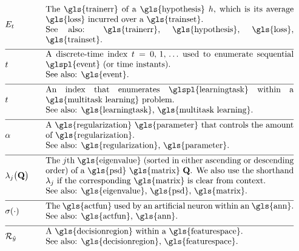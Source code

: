 \begin{align}                          
	&\trainerror &\quad &\parbox{.85\textwidth}{The \gls{trainerr} of a \gls{hypothesis} $\hypothesis$, which is its 
		average \gls{loss} incurred over a \gls{trainset}.
		\\ See also: \gls{trainerr}, \gls{hypothesis}, \gls{loss}, \gls{trainset}. }\nonumber \\[2mm] \hline \nonumber\\[-5mm]
	&\timeidx &\quad &\parbox{.85\textwidth}{A discrete-time index $\timeidx=0, \,1, \,\ldots$ used to 
		enumerate sequential \glspl{event} (or time instants). 
		\\ See also: \gls{event}. }\nonumber \\[2mm] \hline \nonumber\\[-5mm]
	&\taskidx &\quad &\parbox{.85\textwidth}{An index that enumerates
		\glspl{learningtask} within a \gls{multitask learning} problem.
		\\ See also: \gls{learningtask}, \gls{multitask learning}. }\nonumber \\[2mm] \hline \nonumber\\[-5mm]
	&\regparam &\quad &\parbox{.85\textwidth}{A \gls{regularization} \gls{parameter} that controls 
		the amount of \gls{regularization}.
		\\ See also: \gls{regularization}, \gls{parameter}. } \nonumber \\[2mm] \hline \nonumber\\[-5mm]
	&\eigval{\featureidx}\big( \mathbf{Q} \big) &\quad &\parbox{.85\textwidth}{The $\featureidx$th 
		\gls{eigenvalue} (sorted in either ascending or descending order) of a \gls{psd} \gls{matrix} $\mathbf{Q}$. We also 
		use the shorthand $\eigval{\featureidx}$ if the corresponding \gls{matrix} is clear from context.
		\\ See also: \gls{eigenvalue}, \gls{psd}, \gls{matrix}. }\nonumber \\[2mm] \hline \nonumber\\[-5mm]
	&\actfun(\cdot) &\quad &\parbox{.85\textwidth}{The \gls{actfun} used by an artificial neuron within an \gls{ann}.
		\\ See also: \gls{actfun}, \gls{ann}. }\nonumber \\[2mm] \hline \nonumber\\[-5mm]
	&\decreg{\hat{\truelabel}} &\quad &\parbox{.85\textwidth}{A \gls{decisionregion} within a \gls{featurespace}.
		\\ See also: \gls{decisionregion}, \gls{featurespace}. }\nonumber
\end{align}     


